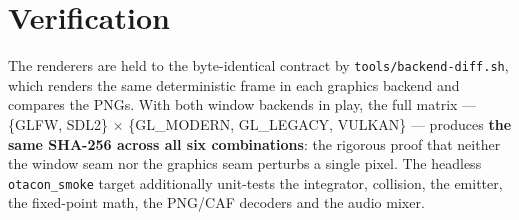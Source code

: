 \documentclass[11pt]{report}
\newcommand{\code}[1]{\texttt{#1}}
\begin{document}
\chapter{Verification}\label{ch:verify}
The renderers are held to the byte-identical contract by \code{tools/backend-diff.sh},
which renders the same deterministic frame in each graphics backend and compares
the PNGs. With both window backends in play, the full matrix --- \{GLFW, SDL2\}
$\times$ \{GL\_MODERN, GL\_LEGACY, VULKAN\} --- produces \textbf{the same SHA-256
across all six combinations}: the rigorous proof that neither the window seam nor
the graphics seam perturbs a single pixel. The headless \code{otacon\_smoke} target
additionally unit-tests the integrator, collision, the emitter, the fixed-point
math, the PNG/CAF decoders and the audio mixer.
\end{document}
